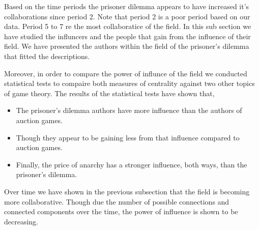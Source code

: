 \documentclass{article}
\begin{document}
Based on the time periods the prisoner dilemma appears to have increased it's
collaborations since period 2. Note that period 2 is a poor period based on our
data. Period 5 to 7 re the most collaboratice of the field.
In this sub section we have studied the influncers and the people that gain
from the influence of their field. We have presented the authors within the
field of the prisoner's dilemma that fitted the descriptions.

Moreover, in order to compare the power of influnce of the field we conducted
statistical tests to compaire both measures of centrality against two other
topics of game theory. The results of the statistical tests have shown that,

\begin{itemize}
    \item The prisoner's dilemma authors have more influence than the authors of
    auction games.
    \item Though they appear to be gaining less from that influence compared to
    auction games.
    \item Finally, the price of anarchy has a stronger influence, both ways, than
    the prisoner's dilemma. 
\end{itemize}

Over time we have shown in the previous subsection that the field is becoming
more collaborative. Though due the number of possible connections and connected
components over the time, the power of influence is shown to be decreasing.


\newpage


\end{document}
